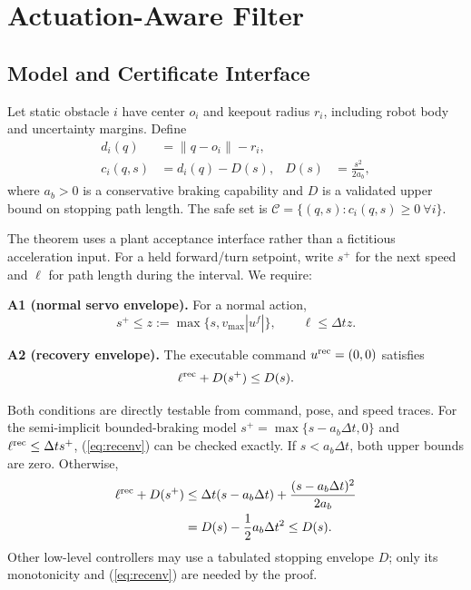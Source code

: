 \documentclass[letterpaper]{article}
\begin{document}
\section{Actuation-Aware Filter}

\subsection{Model and Certificate Interface}

Let static obstacle $i$ have center $o_i$ and keepout radius $r_i$, including
robot body and uncertainty margins.  Define
\begin{equation}
\begin{aligned}
 d_i(q)&=\|q-o_i\|-r_i,\\
 c_i(q,s)&=d_i(q)-D(s), & D(s)&=\frac{s^2}{2a_b},
\end{aligned}                                               \label{eq:manifold}
\end{equation}
where $a_b>0$ is a conservative braking capability and $D$ is a validated
upper bound on stopping path length.  The safe set is
$\mathcal C=\{(q,s):c_i(q,s)\ge0\ \forall i\}$.

The theorem uses a plant acceptance interface rather than a fictitious
acceleration input.  For a held forward/turn setpoint, write $s^+$ for the next
speed and $\ell$ for path length during the interval.  We require:

\textbf{A1 (normal servo envelope).} For a normal action,
\begin{equation}
 s^+\le z:=\max\{s,v_{\max}|u^f|\},\qquad
 \ell\le\Delta t z.                                      \label{eq:normalenv}
\end{equation}

\textbf{A2 (recovery envelope).} The executable command
$u^{\rm rec}=(0,0)$ satisfies
\begin{equation}
 \ell^{\rm rec}+D(s^+)\le D(s).                          \label{eq:recenv}
\end{equation}

Both conditions are directly testable from command, pose, and speed traces.
For the semi-implicit bounded-braking model
$s^+=\max\{s-a_b\Delta t,0\}$ and
$\ell^{\rm rec}\le\Delta t s^+$, (\ref{eq:recenv}) can be checked exactly.
If $s<a_b\Delta t$, both upper bounds are zero.  Otherwise,
\begin{align}
 \ell^{\rm rec}+D(s^+)
 &\le \Delta t(s-a_b\Delta t)
   +\frac{(s-a_b\Delta t)^2}{2a_b}\notag\\
 &=D(s)-\frac12a_b\Delta t^2\le D(s).                  \label{eq:recderive}
\end{align}
Other low-level controllers may use a tabulated stopping envelope $D$; only
its monotonicity and (\ref{eq:recenv}) are needed by the proof.
\end{document}
